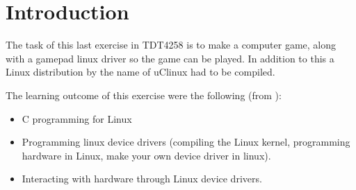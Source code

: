 \section{Introduction}
The task of this last exercise in TDT4258 is to make a computer game, along with a gamepad linux driver so the game can be played. In addition to this a Linux distribution by the name of uClinux had to be compiled.

The learning outcome of this exercise were the following (from \cite{compendium}):
\begin{itemize}
	\item C programming for Linux
	\item Programming linux device drivers (compiling the Linux kernel, programming hardware in Linux, make your own device driver in linux).
	\item Interacting with hardware through Linux device drivers.
\end{itemize}
